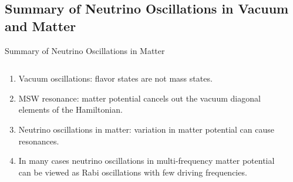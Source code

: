 \subsection{Summary of Neutrino Oscillations in Vacuum and Matter }


\begin{frame}{Summary of Neutrino Oscillations in Matter}


\begin{columns}[T]
\begin{column}{0.6\textwidth}

\begin{enumerate}[<+->]
\item
Vacuum oscillations: flavor states are not mass states.
\item
MSW resonance: matter potential cancels out the vacuum diagonal elements of the Hamiltonian.
\item
Neutrino oscillations in matter: variation in matter potential can cause resonances.

\item
In many cases neutrino oscillations in multi-frequency matter potential can be viewed as Rabi oscillations with few driving frequencies.
\end{enumerate}

\end{column}
\begin{column}{0.4\textwidth}



\end{column}
\end{columns}
\end{frame}
